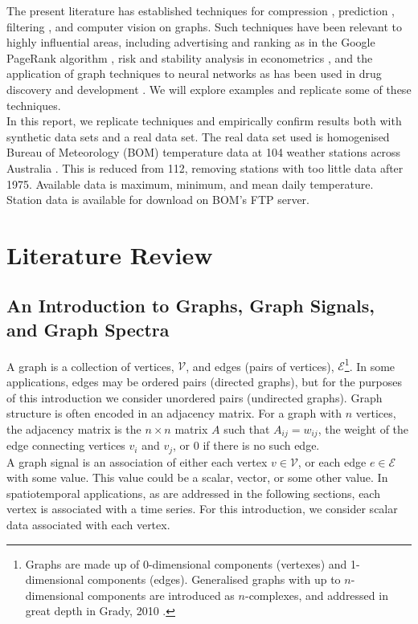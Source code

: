 \documentclass[12pt,a4paper]{article} %
\begin{document}
The present literature has established techniques for compression \cite{moura}, prediction \cite{krige}, filtering \cite{taubin}, and computer vision \cite{grady_shah} on graphs. Such techniques have been relevant to highly influential areas, including advertising and ranking as in the Google PageRank algorithm \cite{page}, risk and stability analysis in econometrics \cite{acemoglu}, and the application of graph techniques to neural networks as has been used in drug discovery and development \cite{sun}. We will explore examples and replicate some of these techniques.\\

In this report, we replicate techniques and empirically confirm results both with synthetic data sets and a real data set. The real data set used is homogenised Bureau of Meteorology (BOM) temperature data at 104 weather stations across Australia \cite{bom}. This is reduced from 112, removing stations with too little data after 1975. Available data is maximum, minimum, and mean daily temperature. Station data is available for download on BOM's FTP server.

\newpage
\section{Literature Review}
\subsection{An Introduction to Graphs, Graph Signals, and Graph Spectra}
\label{subsec:graph_intro}
A graph is a collection of vertices, $\mathcal{V}$, and edges (pairs of vertices), $\mathcal{E}$\footnote{Graphs are made up of 0-dimensional components (vertexes) and 1-dimensional components (edges). Generalised graphs with up to $n$-dimensional components are introduced as $n$-complexes, and addressed in great depth in Grady, 2010 \cite{grady}.}. In some applications, edges may be ordered pairs (directed graphs), but for the purposes of this introduction we consider unordered pairs (undirected graphs). Graph structure is often encoded in an adjacency matrix. For a graph with $n$ vertices, the adjacency matrix is the $n\times n$ matrix $A$ such that $A_{ij}=w_{ij}$, the weight of the edge connecting vertices $v_i$ and $v_j$, or $0$ if there is no such edge.\\

A graph signal is an association of either each vertex $v\in\mathcal{V}$, or each edge $e\in\mathcal{E}$ with some value. This value could be a scalar, vector, or some other value. In spatiotemporal applications, as are addressed in the following sections, each vertex is associated with a time series. For this introduction, we consider scalar data associated with each vertex.\\
\end{document}
